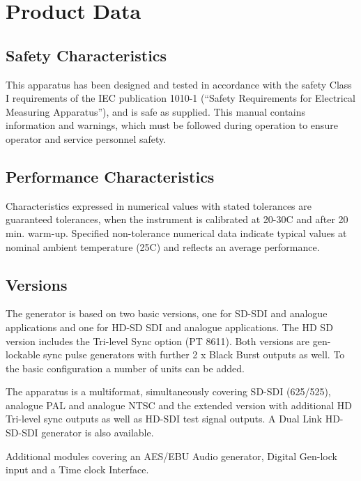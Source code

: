 \section{Product Data}
\label{cha:Product Data}

\subsection{Safety Characteristics}
This apparatus has been designed and tested in accordance with the safety Class I requirements of the IEC publication 1010-1 (``Safety Requirements for Electrical Measuring Apparatus''), and is safe as supplied. This manual contains information and warnings, which must be followed during operation to ensure operator and service personnel safety.

\subsection{Performance Characteristics}
Characteristics expressed in numerical values with stated tolerances are guaranteed tolerances, when the instrument is calibrated at 20-30\degrees C and after 20 min. warm-up. Specified non-tolerance numerical data indicate typical values at nominal ambient temperature (25\degrees C) and reflects an average performance.

\subsection{Versions}
The generator is based on two basic versions, one for SD-SDI and analogue applications and one for HD-SD SDI and analogue applications. The HD SD version includes the Tri-level Sync option (PT 8611). Both versions are gen-lockable sync pulse generators with further 2 x Black Burst outputs as well. To the basic configuration a number of units can be added. 

The apparatus is a multiformat, simultaneously covering SD-SDI (625/525), analogue PAL and analogue NTSC and the extended version with additional HD Tri-level sync outputs as well as HD-SDI test signal outputs. A Dual Link HD-SD-SDI generator is also available.

Additional modules covering an AES/EBU Audio generator, Digital Gen-lock input and a Time clock Interface.

